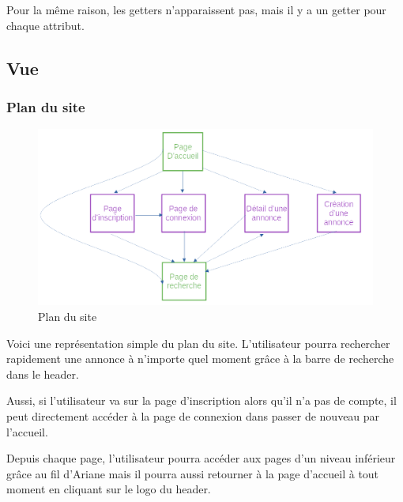 \documentclass[a4paper,11pt]{article}
\begin{document}
Pour la même raison, les getters n'apparaissent pas, mais il y a un getter pour chaque attribut.

\subsection{Vue}

\subsubsection{Plan du site}

\begin{figure}[H]
  \includegraphics[width=\linewidth]{images/plan-du-site.png}
  \caption{Plan du site}
  \label{fig:plan-du-site}
\end{figure}

Voici une représentation simple du plan du site. L'utilisateur pourra rechercher rapidement une annonce
à n'importe quel moment grâce à la barre de recherche dans le header.

Aussi, si l'utilisateur va sur la page d'inscription alors qu'il n'a pas de compte, il peut directement
accéder à la page de connexion dans passer de nouveau par l'accueil.

Depuis chaque page, l'utilisateur pourra accéder aux pages d'un niveau inférieur grâce au fil d'Ariane
mais il pourra aussi retourner à la page d'accueil à tout moment en cliquant sur le logo du header. 

\end{document}
